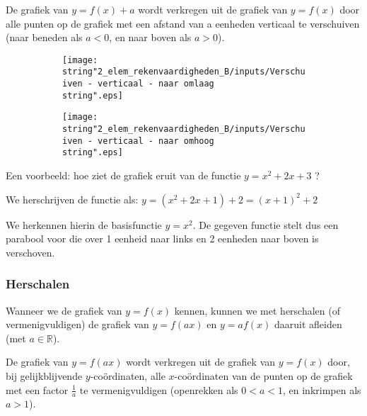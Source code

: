 \noindent De grafiek van $y=f(x)+a$ wordt verkregen uit de grafiek
van $y=f(x)$ door alle punten op de grafiek met een afstand van a
eenheden verticaal te verschuiven (naar beneden als $a<0$, en naar
boven als $a>0$).

\noindent \medskip{}

\begin{figure}[h]
	\centering
	\begin{subfigure}{.48\linewidth}
		\texttt{[image: \\string"2\_elem\_rekenvaardigheden\_B/inputs/Verschuiven - verticaal - naar omlaag\\string".eps]}
	\end{subfigure}
	\begin{subfigure}{.48\linewidth}
		\texttt{[image: \\string"2\_elem\_rekenvaardigheden\_B/inputs/Verschuiven - verticaal - naar omhoog\\string".eps]}
	\end{subfigure}
\end{figure}



Een voorbeeld: hoe ziet de grafiek eruit van de functie $y=x^{2}+2x+3$
?

We herschrijven de functie als: $y=\left(x^{2}+2x+1\right)+2=\left(x+1\right)^{2}+2$

We herkennen hierin de basisfunctie $y=x^{2}$. De gegeven functie
stelt dus een parabool voor die over 1 eenheid naar links en 2 eenheden
naar boven is verschoven.


\subsubsection{Herschalen}

\noindent Wanneer we de grafiek van $y=f(x)$ kennen, kunnen we met
herschalen (of vermenigvuldigen) de grafiek van $y=f(ax)$ en $y=af(x)$
daaruit afleiden (met $a\in\mathbb{R}$).

\medskip{}


\noindent De grafiek van $y=f(ax)$ wordt verkregen uit de grafiek
van $y=f(x)$ door, bij gelijkblijvende $y$-co\"ordinaten, alle $x$-co\"ordinaten
van de punten op de grafiek met een factor $\frac{1}{a}$ te vermenigvuldigen
(openrekken als $0<a<1$, en inkrimpen als $a>1$).

